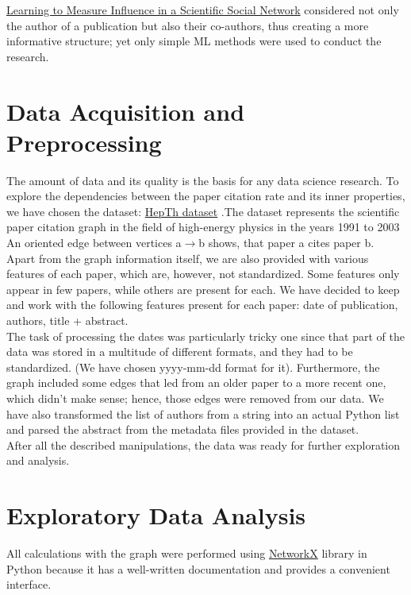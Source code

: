 \documentclass{article}
\newcommand\tab[1][1cm]{\hspace*{#1}}
\begin{document}
\tab \href{https://link.springer.com/chapter/10.1007/978-3-319-06483-3_4?fromPaywallRec=true}{Learning to Measure Influence in a Scientific Social Network} considered not only the author of a publication but also their co-authors, thus creating a more informative structure; yet only simple ML methods were used to conduct the research.\\
\section{Data Acquisition and Preprocessing}

\tab	The amount of data and its quality is the basis for any data science research. To explore the dependencies between the paper citation rate and its inner properties, we have chosen the dataset: \href{https://www.kaggle.com/datasets/wolfram77/graphs-snap-cit}{HepTh dataset} .The dataset represents the scientific paper citation graph in the field of high-energy physics in the years 1991 to 2003 \\
\tab	 An oriented edge between vertices a$\rightarrow$b shows, that paper a cites paper b. Apart from the graph information itself, we are also provided with various features of each paper, which are, however, not standardized. Some features only appear in few papers, while others are present for each. We have decided to keep and work with the following features present for each paper: date of publication, authors, title + abstract. \\
\tab	The task of processing the dates was particularly tricky one since that part of the data was stored in a multitude of different formats, and they had to be standardized. (We have chosen yyyy-mm-dd format for it). Furthermore, the graph included some edges that led from an older paper to a more recent one, which didn't make sense; hence, those edges were removed from our data. We have also transformed the list of authors from a string into an actual Python list and parsed the abstract from the metadata files provided in the dataset. \\
\tab	After all the described manipulations, the data was ready for further exploration and analysis. \\

\section{Exploratory Data Analysis}
\tab All calculations with the graph were performed using \href{https://networkx.org/}{NetworkX} library in Python because it has a well-written documentation and provides a convenient interface.
\end{document}
